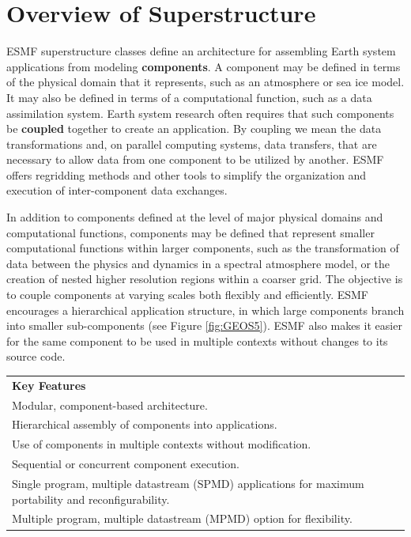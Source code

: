 %

\section{Overview of Superstructure}

ESMF superstructure classes define an architecture for assembling
Earth system applications from modeling {\bf components}.  A component
may be defined in terms of the physical domain that it represents,
such as an atmosphere or sea ice model.  It may also be defined in terms
of a computational function, such as a data assimilation system.
Earth system research often requires that such components be {\bf coupled} 
together to create an application.  By coupling we mean the data 
transformations and, on parallel computing systems, data transfers, 
that are necessary to allow data from one component to be utilized by 
another.  ESMF offers regridding methods and other tools to simplify 
the organization and execution of inter-component data exchanges.  

In addition to components defined at the level of major physical 
domains and computational functions, components may be defined that 
represent smaller computational functions within larger components, 
such as the transformation of data between the physics and dynamics 
in a spectral atmosphere model, 
or the creation of nested higher resolution regions 
within a coarser grid.  The objective is to couple components at varying 
scales both flexibly and efficiently.  ESMF encourages a hierarchical
application structure, in which large components branch into 
smaller sub-components (see Figure \ref{fig:GEOS5}).  ESMF also makes 
it easier for the same component to be used in multiple contexts 
without changes to its source code.

\begin{center}  
\begin{tabular}{|p{6in}|}
\hline
\vspace{.01in}
{\bf Key Features} \\[.01in]
Modular, component-based architecture. \\
Hierarchical assembly of components into applications.\\
Use of components in multiple contexts without modification.\\
Sequential or concurrent component execution.\\
Single program, multiple datastream (SPMD) applications for 
maximum portability and reconfigurability.\\
Multiple program, multiple datastream (MPMD) option for 
flexibility.\\ [.03in] \hline
\end{tabular}
\end{center}


